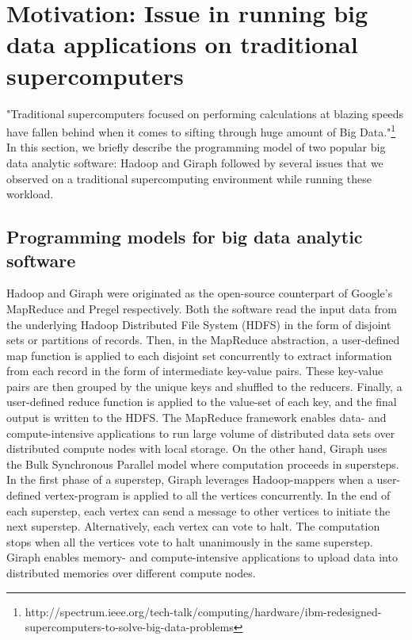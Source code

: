 \documentclass[conference]{IEEEtran}
\begin{document}
\section {Motivation: Issue in running big data applications on traditional supercomputers} \label{Bigdata Softwares on Traditional Supercomputers}
"Traditional supercomputers focused on performing calculations at blazing speeds have fallen behind when it comes to sifting through huge amount of Big Data."\footnote{http://spectrum.ieee.org/tech-talk/computing/hardware/ibm-redesigned-supercomputers-to-solve-big-data-problems}\\
In this section, we briefly describe the programming model of two popular big data analytic software: Hadoop and Giraph followed by several issues that we observed on a traditional supercomputing environment while running these workload.
\subsection {Programming models for big data analytic software}
Hadoop and Giraph were originated as the open-source counterpart of Google's MapReduce \cite{fw:mapreduce} and Pregel \cite{fw:pregel} respectively. Both the software read the input data from the underlying Hadoop Distributed File System (HDFS) in the form of disjoint sets or partitions of records. Then, in the MapReduce abstraction, a user-defined map function is applied to each disjoint set concurrently to extract information from each record in the form of intermediate key-value pairs. These key-value pairs are then grouped by the unique keys and shuffled to the reducers. Finally, a user-defined reduce function is applied to the value-set of each key, and the final output is written to the HDFS. The MapReduce framework enables data- and compute-intensive applications to run large volume of distributed data sets over distributed compute nodes with local storage. On the other hand, Giraph uses the Bulk Synchronous Parallel model \cite{fw:bsp} where computation proceeds in supersteps. In the first phase of a superstep, Giraph leverages Hadoop-mappers when a user-defined vertex-program is applied to all the vertices concurrently. In the end of each superstep, each vertex can send a message to other vertices to initiate the next superstep. Alternatively, each vertex can vote to halt. The computation stops when all the vertices vote to halt unanimously in the same superstep. Giraph enables memory- and compute-intensive applications to upload data into distributed memories over different compute nodes.
\end{document}

